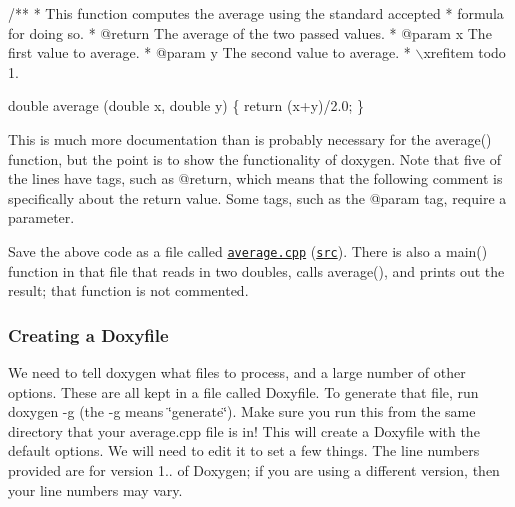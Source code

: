 \begin{DoxyCode}
/** * This function computes the average using the standard accepted
 * formula for doing so.
 * @return The average of the two passed values.
 * @param x The first value to average.
 * @param y The second value to average.
 * \(\backslash\)xrefitem todo 1.

double average (double x, double y) \{
  return (x+y)/2.0;
\}
\end{DoxyCode}


This is much more documentation than is probably necessary for the {\ttfamily average()} function, but the point is to show the functionality of doxygen. Note that five of the lines have tags, such as {\ttfamily @return}, which means that the following comment is specifically about the return value. Some tags, such as the {\ttfamily @param} tag, require a parameter.

Save the above code as a file called \href{average.cpp.html}{\tt average.\+cpp} (\href{average.cpp}{\tt src}). There is also a {\ttfamily main()} function in that file that reads in two doubles, calls {\ttfamily average()}, and prints out the result; that function is not commented.

\subsubsection*{Creating a Doxyfile}

We need to tell doxygen what files to process, and a large number of other options. These are all kept in a file called {\ttfamily Doxyfile}. To generate that file, run {\ttfamily doxygen -\/g} (the {\ttfamily -\/g} means \char`\"{}generate\char`\"{}). Make sure you run this from the same directory that your average.\+cpp file is in! This will create a Doxyfile with the default options. We will need to edit it to set a few things. The line numbers provided are for version 1.. of Doxygen; if you are using a different version, then your line numbers may vary.


